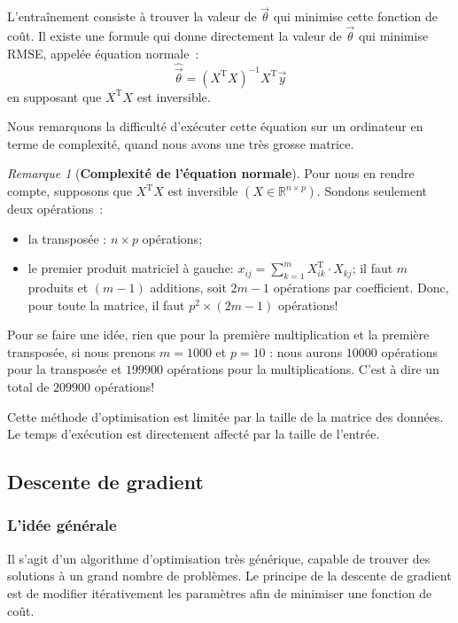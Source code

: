 \documentclass[a4paper,12pt,twoside]{report}
\theoremstyle{definition}
\theoremstyle{plain}
\theoremstyle{remark}
\newtheorem*{rem}{Remarque}
\begin{document}
L'entraînement consiste à trouver la valeur de $\vec{\theta}$ qui minimise cette fonction de coût. Il existe une formule qui donne directement la valeur de $\vec{\theta}$ qui minimise \ac{RMSE}, appelée équation normale~:
\[ \hat{\vec{\theta}} = (X^{\mathrm{T}} X)^{-1} X^{\mathrm{T}} \vec{y} \]
en supposant que $X^{\mathrm{T}} X$ est inversible.

Nous remarquons la difficulté d'exécuter cette équation sur un ordinateur en terme de complexité, quand nous avons une très grosse matrice.

\begin{rem}[\textbf{Complexité de l'équation normale}]
	Pour nous en rendre compte, supposons que $X^{\mathrm{T}} X$ est inversible $(X \in \mathbb{R}^{n \times p})$. Sondons seulement deux opérations~:
	\begin{itemize}
		\item la transposée : $n \times p$ opérations;
		\item le premier produit matriciel à gauche: $x_{ij} = \sum_{k=1}^{m} X_{ik}^{\mathrm{T}} \cdot X_{kj}$; il faut $m$ produits et $(m-1)$ additions, soit $2m-1$ opérations par coefficient. Donc, pour toute la matrice, il faut $p^2 \times (2m-1)$ opérations!
	\end{itemize}
	
	Pour se faire une idée, rien que pour la première multiplication et la première transposée, si nous prenons $m=1000$ et $p=10$ : nous aurons $10000$ opérations pour la transposée et $199900$ opérations pour la multiplications. C'est à dire un total de $209900$ opérations!
\end{rem}

Cette méthode d'optimisation est limitée par la taille de la matrice des données. Le temps d'exécution est directement affecté par la taille de l'entrée.

\subsection{Descente de gradient}

\subsubsection{L'idée générale}

Il s'agit d'un algorithme d'optimisation très générique, capable de trouver des solutions à un grand nombre de problèmes. Le principe de la descente de gradient est de modifier itérativement les paramètres afin de minimiser une fonction de coût.
\end{document}
